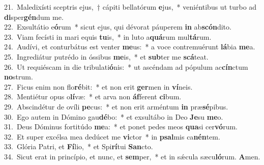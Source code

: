 {21.~}Maledixísti sceptris ejus,~† cápiti bellatórum \textbf{e}jus,~* veniéntibus ut turbo ad \textbf{di}sper\textbf{gén}dum me.\\
{22.~}Exsultátio e\textbf{ó}rum~* sicut ejus, qui dévorat páuperem \textbf{in} ab\textbf{scón}dito.\\
{23.~}Viam fecísti in mari equis \textbf{tu}is,~* in luto a\textbf{quá}rum mul\textbf{tá}rum.\\
{24.~}Audívi, et conturbátus est venter \textbf{me}us:~* a voce contremuérunt \textbf{lá}bia \textbf{me}a.\\
{25.~}Ingrediátur putrédo in óssibus \textbf{me}is,~* et \textbf{sub}ter me \textbf{scá}teat.\\
{26.~}Ut requiéscam in die tribulati\textbf{ó}nis:~* ut ascéndam ad pópulum ac\textbf{cín}ctum \textbf{no}strum.\\
{27.~}Ficus enim non flo\textbf{ré}bit:~* et non erit \textbf{ger}men in \textbf{ví}neis.\\
{28.~}Mentiétur opus o\textbf{lí}væ:~* et arva non \textbf{áf}ferent \textbf{ci}bum.\\
{29.~}Abscindétur de ovíli \textbf{pe}cus:~* et non erit arméntum \textbf{in} præ\textbf{sé}pibus.\\
{30.~}Ego autem in Dómino gau\textbf{dé}bo:~* et exsultábo in Deo \textbf{Je}su \textbf{me}o.\\
{31.~}Deus Dóminus fortitúdo \textbf{me}a:~* et ponet pedes meos \textbf{qua}si cer\textbf{vó}rum.\\
{32.~}Et super excélsa mea dedúcet me \textbf{vi}ctor~* in \textbf{psal}mis ca\textbf{nén}tem.\\
{33.~}Glória Patri, et \textbf{Fí}lio,~* et Spi\textbf{rí}tui \textbf{San}cto.\\
{34.~}Sicut erat in princípio, et nunc, et \textbf{sem}per,~* et in sǽcula sæcu\textbf{ló}rum. \textbf{A}men.\\
